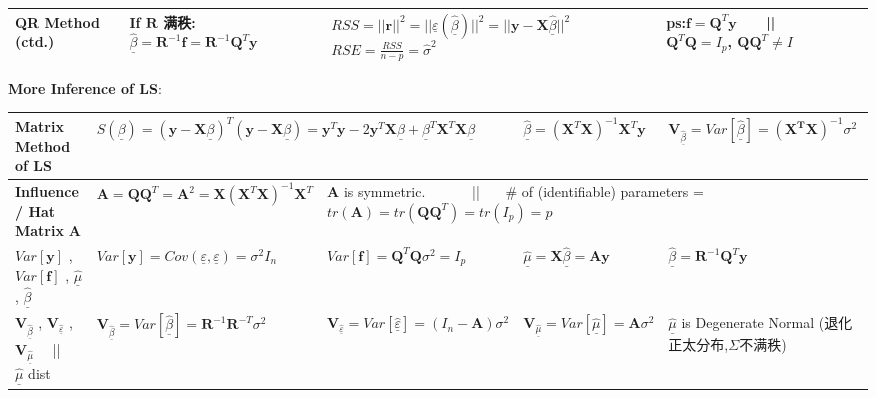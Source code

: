 \documentclass[9pt]{article}
\begin{document}
{\begin{longtable}{|l||l|l|l|l|l|}
    \hline
    {\scriptsize QR Method (ctd.)} & If $\mathbf{R}$ 满秩: \ \ $\widehat{\underline{\beta}}=\mathbf{R}^{-1}\mathbf{f}=\mathbf{R}^{-1}\mathbf{Q}^T\mathbf{y}$ & \multicolumn{3}{l|}{\scriptsize $RSS=||\mathbf{r}||^2=||\underline{\varepsilon}(\underline{\widehat{\beta}})||^2=||\mathbf{y}-\mathbf{X}\underline{\widehat{\beta}}||^2$ \ \ \ $RSE=\frac{RSS}{n-p}=\widehat{\sigma}^2$} & ps:$\mathbf{f}=\mathbf{Q}^T\mathbf{y}$ \ \ \ || \ \ \ $\mathbf{Q}^T\mathbf{Q}=I_p$, $\mathbf{Q}\mathbf{Q}^T\ne I$  \\
    \hline
\end{longtable}
\vspace{-10pt}
}

\textbf{More Inference of LS}:

{\footnotesize
\vspace{-7pt}
\begin{longtable}[alignment]{|l||l|l|l|l|}
    \hline
    Matrix Method of LS & \multicolumn{2}{l|}{$S(\underline{\beta})=(\mathbf{y}-\mathbf{X}\underline{\beta})^T(\mathbf{y}-\mathbf{X}\underline{\beta})=\mathbf{y}^T\mathbf{y}-2\mathbf{y}^T\mathbf{X}\underline{\beta}+\underline{\beta}^T\mathbf{X}^T\mathbf{X}\underline{\beta}$} & $\underline{\widehat{\beta}}=(\mathbf{X}^T\mathbf{X})^{-1}\mathbf{X}^T\mathbf{y}$ & $\mathbf{V}_{\underline{\widehat{\beta}}}=Var[\widehat{\underline{\beta}}]=(\mathbf{X^T}\mathbf{X})^{-1}\sigma^2$ \\
    \hline
    \hline
    \textbf{Influence / Hat Matrix} $\mathbf{A}$ & $\mathbf{A}=\mathbf{Q}\mathbf{Q}^T=\mathbf{A}^2=\mathbf{X}(\mathbf{X}^T\mathbf{X})^{-1}\mathbf{X}^T$ & \multicolumn{3}{l|}{$\mathbf{A}$ is symmetric. \ \ \ \ \ \ || \ \ \ \# of (identifiable) parameters = $tr(\mathbf{A})=tr(\mathbf{Q}\mathbf{Q}^T)=tr(I_p)=p$} \\
    \hline
    $Var[\mathbf{y}]$ , $Var[\mathbf{f}]$ , $\widehat{\underline{\mu}}$ , $\widehat{\underline{\beta}}$ & $Var[\mathbf{y}]=Cov(\underline{\varepsilon},\underline{\varepsilon})=\sigma^2I_n$ & $Var[\mathbf{f}]=\mathbf{Q}^T\mathbf{Q}\sigma^2=\mathbf{}I_p$ & $\underline{\hat{\mu}}=\mathbf{X}\widehat{\underline{\beta}}=\mathbf{A}\mathbf{y}$ & $\widehat{\underline{\beta}}=\mathbf{R}^{-1}\mathbf{Q}^T\mathbf{y}$ \\
    \hline
    $\mathbf{V}_{\underline{\widehat{\beta}}}$ , $\mathbf{V}_{\widehat{\underline{\varepsilon}}}$ , $\mathbf{V}_{\widehat{\underline{\mu}}}$ \ \ || \ \ $\underline{\widehat{\mu}}$ dist & $\mathbf{V}_{\widehat{\underline{\beta}}}=Var[\widehat{\underline{\beta}}]=\mathbf{R}^{-1}\mathbf{R}^{-T}\sigma^2$ & $\mathbf{V}_{\widehat{\underline{\varepsilon}}}=Var[\underline{\widehat{\varepsilon}}]=(I_n-\mathbf{A})\sigma^2$ & $\mathbf{V}_{\widehat{\underline{\mu}}}=Var[\underline{\widehat{\mu}}]=\mathbf{A}\sigma^2$ & $\widehat{\underline{\mu}}$ {\tiny is Degenerate Normal (退化正太分布,$\Sigma$不满秩)} \\

\end{longtable}}
\end{document}

